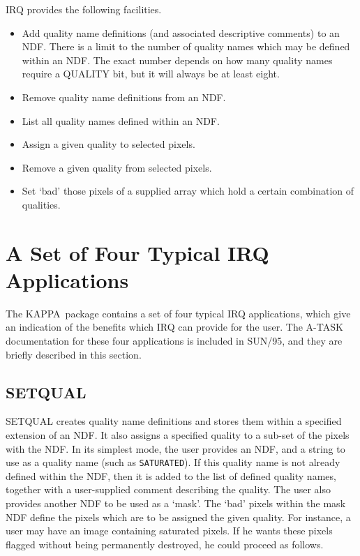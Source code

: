 \documentclass[twoside,11pt]{article}
\newcommand{\xref}[3]{#1}
\renewcommand{\_}{\texttt{\symbol{95}}}
\newcommand{\KAPPA}{{\footnotesize KAPPA}\normalsize}
\begin{document}
IRQ provides the following facilities.
\begin{itemize}
\item Add quality name definitions (and associated descriptive comments)
to an NDF. There is a limit to the number of quality names which may be
defined within an NDF. The exact number depends on how many quality names
require a QUALITY bit, but it will always be at least eight. 
\item Remove quality name definitions from an NDF.
\item List all quality names defined within an NDF.
\item Assign a given quality to selected pixels.
\item Remove a given quality from selected pixels.
\item Set `bad' those pixels of a supplied array which hold a certain 
combination of qualities.
\end{itemize}

\section {A Set of Four Typical IRQ Applications}

The \KAPPA\ package contains a set of four typical IRQ applications,
which give an indication of the benefits which IRQ can provide for the
user. The A-TASK documentation for these four applications is included
in \xref{SUN/95}{sun95}{se_qualitymask}, and they are briefly described
in this section. 

\subsection{SETQUAL}

\xref{SETQUAL}{sun95}{SETQUAL} creates quality name definitions and
stores them within a specified extension of an NDF. It also assigns a
specified quality to a sub-set of the pixels with the NDF. In its
simplest mode, the user provides an NDF, and a string to use as a quality
name (such as {\tt SATURATED}). If this quality name is not already
defined within the NDF, then it is added to the list of defined quality
names, together with a user-supplied comment describing the quality. The
user also provides another NDF to be used as a `mask'. The `bad' pixels
within the mask NDF define the pixels which are to be assigned the given
quality. For instance, a user may have an image containing saturated
pixels. If he wants these pixels flagged without being permanently
destroyed, he could proceed as follows.
\end{document}
